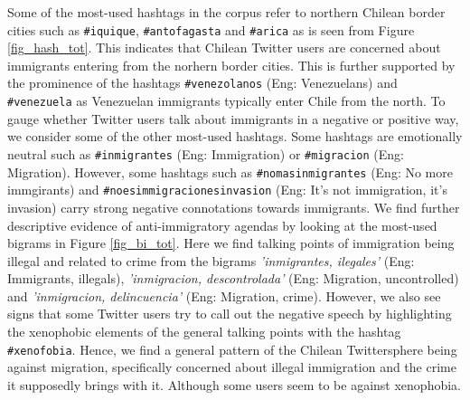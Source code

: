         
        
        Some of the most-used hashtags in the corpus refer to northern Chilean border cities such as \texttt{\#iquique}, \texttt{\#antofagasta} and \texttt{\#arica} as is seen from Figure \ref{fig_hash_tot}. This indicates that Chilean Twitter users are concerned about immigrants entering from the norhern border cities. This is further supported by the prominence of the hashtags \texttt{\#venezolanos} (Eng: Venezuelans) and \texttt{\#venezuela} as Venezuelan immigrants typically enter Chile from the north. To gauge whether Twitter users talk about immigrants in a negative or positive way, we consider some of the other most-used hashtags. Some hashtags are emotionally neutral such as \texttt{\#inmigrantes} (Eng: Immigration) or \texttt{\#migracion} (Eng: Migration). However, some hashtags such as \texttt{\#nomasinmigrantes} (Eng: No more immgirants) and \texttt{\#noesimmigracionesinvasion} (Eng: It's not immigration, it's invasion) carry strong negative connotations towards immigrants. We find further descriptive evidence of anti-immigratory agendas by looking at the most-used bigrams in Figure \ref{fig_bi_tot}. Here we find talking points of immigration being illegal and related to crime from the bigrams {\it 'inmigrantes, ilegales'} (Eng: Immigrants, illegals), {\it 'inmigracion, descontrolada'} (Eng: Migration, uncontrolled) and {\it 'inmigracion, delincuencia'} (Eng: Migration, crime). However, we also see signs that some Twitter users try to call out the negative speech by highlighting the xenophobic elements of the general talking points with the hashtag \texttt{\#xenofobia}. Hence, we find a general pattern of the Chilean Twittersphere being against migration, specifically concerned about illegal immigration and the crime it supposedly brings with it. Although some users seem to be against xenophobia.
        
